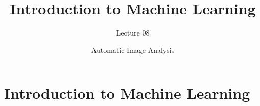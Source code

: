 \documentclass[aspectratio=169,xcolor=dvipsnames]{beamer}
\title[short title]{Introduction to Machine Learning}
\subtitle{Lecture 08}
\author{Automatic Image Analysis}
\begin{document}
\begin{frame}
    \titlepage
\end{frame}


\section{Introduction to Machine Learning}




\end{document}
